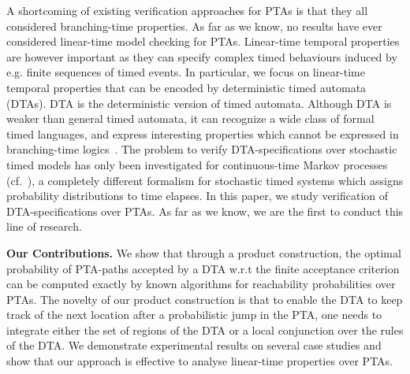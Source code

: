 A shortcoming of existing verification approaches for PTAs is that they all considered branching-time properties.
As far as we know, no results have ever considered linear-time model checking for PTAs.
Linear-time temporal properties are however important as they can specify complex timed behaviours induced by e.g. finite sequences of timed events.
In particular, we focus on linear-time temporal properties that can be encoded by deterministic timed automata (DTAs).
DTA is the deterministic version of timed automata.
Although DTA is weaker than general timed automata, it can recognize a wide class of formal timed languages, and express interesting properties which cannot be expressed in branching-time logics~\cite{DBLP:journals/tse/DonatelliHS09}.
The problem to verify DTA-specifications over stochastic timed models has only been investigated for continuous-time Markov processes (cf.~\cite{DBLP:journals/tse/DonatelliHS09,DBLP:journals/corr/abs-1101-3694,DBLP:conf/hybrid/Fu13,DBLP:conf/hybrid/BrazdilKKKR11,DBLP:conf/tacas/BarbotCHKM11,DBLP:conf/formats/BortolussiL15}), a completely different formalism for stochastic timed systems which assigns probability distributions to time elapses.
In this paper, we study verification of DTA-specifications over PTAs.
As far as we know, we are the first to conduct this line of research.

\textbf{Our Contributions.} We show that through a product construction, the optimal probability of PTA-paths accepted by a DTA w.r.t the finite acceptance criterion can be computed exactly by known algorithms for reachability probabilities over PTAs.
The novelty of our product construction is that to enable the DTA to keep track of the next location after a probabilistic jump in the PTA, one needs to integrate either the set of regions of the DTA or a local conjunction over the rules of the DTA.
We demonstrate experimental results on several case studies and show that our approach is effective to analyse linear-time properties over PTAs.

